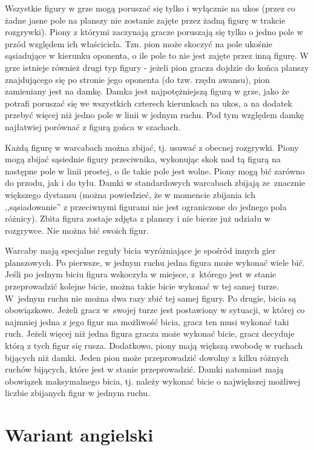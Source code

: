 \FloatBarrier

Wszystkie figury w grze mogą poruszać się tylko i wyłącznie na ukos (przez co żadne jasne pole na planszy nie zostanie zajęte przez żadną figurę w trakcie rozgrywki). Piony z którymi zaczynają gracze poruszają się tylko o jedno pole w przód względem ich właściciela. Tzn. pion może skoczyć na pole ukośnie sąsiadujące w kierunku oponenta, o ile pole to nie jest zajęte przez inną figurę. W grze istnieje również drugi typ figury - jeżeli pion gracza dojdzie do końca planszy znajdującego się po stronie jego oponenta (do tzw. rzędu awansu), pion zamieniany jest na damkę. Damka jest najpotężniejszą figurą w grze, jako że potrafi poruszać się we wszystkich czterech kierunkach na ukos, a na dodatek przebyć więcej niż jedno pole w linii w jednym ruchu. Pod tym względem damkę najłatwiej porównać z figurą gońca w szachach.

Każdą figurę w warcabach można zbijać, tj. usuwać z obecnej rozgrywki. Piony mogą zbijać sąsiednie figury przeciwnika, wykonując skok nad tą figurą na następne pole w linii prostej, o ile takie pole jest wolne. Piony mogą bić zarówno do przodu, jak i do tyłu. Damki w standardowych warcabach zbijają ze~znacznie większego dystansu (można powiedzieć, że w momencie zbijania ich ,,sąsiadowanie'' z przeciwnymi figurami nie jest ograniczone do jednego pola różnicy). Zbita figura zostaje zdjęta z planszy i nie bierze już udziału w rozgrywce. Nie można bić swoich figur.

Warcaby mają specjalne reguły bicia wyróżniające je spośród innych gier planszowych. Po pierwsze, w jednym ruchu jedna figura może wykonać wiele bić. Jeśli po jednym biciu figura wskoczyła w miejsce, z~którego jest w stanie przeprowadzić kolejne bicie, można takie bicie wykonać w tej samej turze. W~jednym ruchu nie można dwa razy zbić tej samej figury. Po drugie, bicia są obowiązkowe. Jeżeli gracz w~swojej turze jest postawiony w sytuacji, w której co najmniej jedna z jego figur ma możliwość bicia, gracz ten musi wykonać taki ruch. Jeżeli więcej niż jedna figura gracza może wykonać bicie, gracz decyduje którą z tych figur się rusza. Dodatkowo, piony mają większą swobodę w ruchach bijących niż damki. Jeden pion może przeprowadzić dowolny z kilku różnych ruchów bijących, które jest w stanie przeprowadzić. Damki natomiast mają obowiązek maksymalnego bicia, tj. należy wykonać bicie o największej możliwej liczbie zbijanych figur w jednym ruchu.

\section{Wariant angielski}

